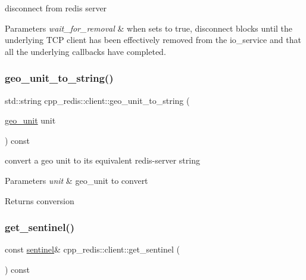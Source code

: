 disconnect from redis server


\begin{DoxyParams}{Parameters}
{\em wait\+\_\+for\+\_\+removal} & when sets to true, disconnect blocks until the underlying T\+CP client has been effectively removed from the io\+\_\+service and that all the underlying callbacks have completed. \\
\hline
\end{DoxyParams}
\mbox{\label{classcpp__redis_1_1client_aa8a686097a5340eb50e838f14342e302}} 
\subsubsection{\texorpdfstring{geo\+\_\+unit\+\_\+to\+\_\+string()}{geo\_unit\_to\_string()}}
{\footnotesize\ttfamily std\+::string cpp\+\_\+redis\+::client\+::geo\+\_\+unit\+\_\+to\+\_\+string (\begin{DoxyParamCaption}\item[{\mbox{\hyperlink{classcpp__redis_1_1client_aa5998536fd32ff4387c89be514997620}{geo\+\_\+unit}}}]{unit }\end{DoxyParamCaption}) const}

convert a geo unit to its equivalent redis-\/server string


\begin{DoxyParams}{Parameters}
{\em unit} & geo\+\_\+unit to convert \\
\hline
\end{DoxyParams}
\begin{DoxyReturn}{Returns}
conversion 
\end{DoxyReturn}
\mbox{\label{classcpp__redis_1_1client_a8325d57c88811254f9f9dab8030d7e8c}} 
\subsubsection{\texorpdfstring{get\+\_\+sentinel()}{get\_sentinel()}\hspace{0.1cm}{\footnotesize\ttfamily [1/2]}}
{\footnotesize\ttfamily const \mbox{\hyperlink{classcpp__redis_1_1sentinel}{sentinel}}\& cpp\+\_\+redis\+::client\+::get\+\_\+sentinel (\begin{DoxyParamCaption}{ }\end{DoxyParamCaption}) const}

